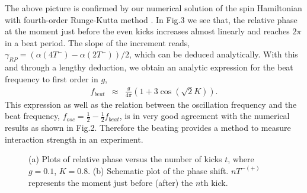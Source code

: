 \documentclass[twocolumn,prl,aps,showpacs]{revtex4}
\begin{document}
The above picture is confirmed by our numerical solution of 
the spin Hamiltonian with
fourth-order Runge-Kutta method \cite{recipe}. 
In Fig.3 we see that, the relative phase
at the moment just before the even kicks increases almost linearly and
reaches $2\pi $ in  a beat period. 
The slope of the increment reads, 
$\gamma_{RP}=\left( \alpha \left( 4T^{-}\right) -
\alpha \left( 2T^{-}\right) \right) /2$, which 
can be deduced analytically. 
With this and through a lengthy deduction, we obtain  an analytic 
expression for the beat frequency to first order in $g$, 
\begin{eqnarray}
f_{beat} &\approx &\frac g{4\pi} \left( 1+3\cos\left(\sqrt2K\right)\right). \label{3}
\end{eqnarray}
This expression as well as the relation
between the oscillation frequency and the  beat frequency, $f_{osc}=\frac 12-\frac
12f_{beat}$, is in very good agreement with  
the numerical results as 
shown in Fig.2. Therefore the beating provides a method to measure interaction strength in an experiment.

\begin{figure}[!t]
\vspace*{-0.5cm}
\begin{center}
\end{center}
\vspace*{-0.7cm}

\caption{(a) Plots of relative phase versus the number of kicks $%
t $, where $g=0.1$, $K=0.8$. (b) Schematic plot of the phase shift. $nT^{-(+)}$ represents the moment just before (after) the $n$th kick.}
\label{fig:classical1}
\end{figure}
\end{document}
